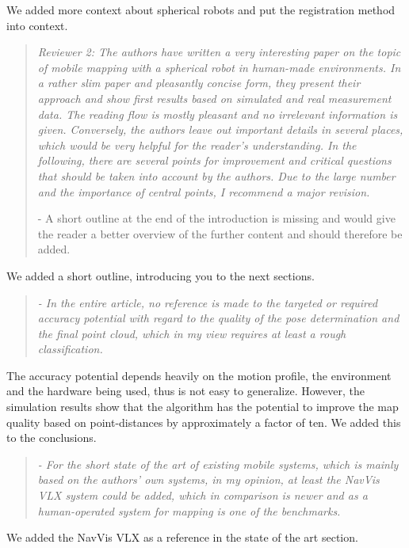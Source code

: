 \documentclass{article}
\newenvironment{itquote}
  {\begin{quote}\itshape}
  {\end{quote}\ignorespacesafterend}
\begin{document}
We added more context about spherical robots and put the registration 
method into context. 

\begin{itquote} 
Reviewer 2: The authors have written a very interesting paper on the
topic of mobile mapping with a spherical robot in human-made
environments. In a rather slim paper and pleasantly concise form,
they present their approach and show first results based on
simulated and real measurement data. The reading flow is mostly
pleasant and no irrelevant information is given. Conversely, the
authors leave out important details in several places, which would
be very helpful for the reader's understanding. In the following,
there are several points for improvement and critical questions that
should be taken into account by the authors. Due to the large number
and the importance of central points, I recommend a major revision.
 
- A short outline at the end of the introduction is missing and
would give the reader a better overview of the further content and
should therefore be added.
\end{itquote}

We added a short outline, introducing you to the next sections.

\begin{itquote} 
- In the entire article, no reference is made to the targeted or
required accuracy potential with regard to the quality of the pose
determination and the final point cloud, which in my view requires
at least a rough classification.
\end{itquote}

The accuracy potential depends heavily on the motion profile, the environment
and the hardware being used, thus is not easy to generalize. However, the
simulation results show that the algorithm has the potential to improve the map
quality based on point-distances by approximately a factor of ten. We added this
to the conclusions.

\begin{itquote}
- For the short state of the art of existing mobile systems, which
is mainly based on the authors' own systems, in my opinion, at least
the NavVis VLX system could be added, which in comparison is newer
and as a human-operated system for mapping is one of the benchmarks.
\end{itquote}

We added the NavVis VLX as a reference in the state of the art section.
\end{document}
